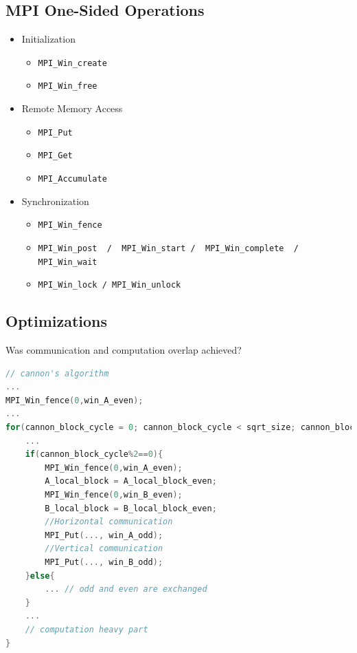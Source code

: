 \documentclass[9pt,pdftex]{beamer}
\begin{document}
\subsection{MPI One-Sided Operations}
\begin{frame}{\insertsubsection}
\begin{itemize}
	\item Initialization
	\begin{itemize}
		\item \lstinline[basicstyle=\scriptsize\bf]{MPI_Win_create}
		\item \lstinline[basicstyle=\scriptsize\bf]{MPI_Win_free}
	\end{itemize}
	
	\item Remote Memory Access
	\begin{itemize}
		\item \lstinline[basicstyle=\scriptsize\bf]{MPI_Put}
		\item \lstinline[basicstyle=\scriptsize]{MPI_Get}
		\item \lstinline[basicstyle=\scriptsize]{MPI_Accumulate}                 
	\end{itemize}

	\item Synchronization
	\begin{itemize}
		\item \lstinline[basicstyle=\scriptsize\bf]{MPI_Win_fence}
		\item \lstinline[basicstyle=\scriptsize]{MPI_Win_post  /  MPI_Win_start /  MPI_Win_complete  / MPI_Win_wait}
		\item \lstinline[basicstyle=\scriptsize]{MPI_Win_lock / MPI_Win_unlock}
	\end{itemize}
\end{itemize}
\end{frame}


\subsection{Optimizations}
\begin{frame}[fragile]{\insertsubsection}
\begin{block}{Was communication and computation overlap achieved?}
\begin{lstlisting}[language=C, basicstyle=\scriptsize, keepspaces=true, columns=flexible]
// cannon's algorithm
...
MPI_Win_fence(0,win_A_even); 
...
for(cannon_block_cycle = 0; cannon_block_cycle < sqrt_size; cannon_block_cycle++){
    ...
    if(cannon_block_cycle%2==0){
        MPI_Win_fence(0,win_A_even);
        A_local_block = A_local_block_even;
        MPI_Win_fence(0,win_B_even);
        B_local_block = B_local_block_even;
        //Horizontal communication
        MPI_Put(..., win_A_odd);
        //Vertical communication
        MPI_Put(..., win_B_odd);
    }else{
        ... // odd and even are exchanged
    }
    ...
    // computation heavy part
}
\end{lstlisting}
\end{block}
\end{frame}
\end{document}
